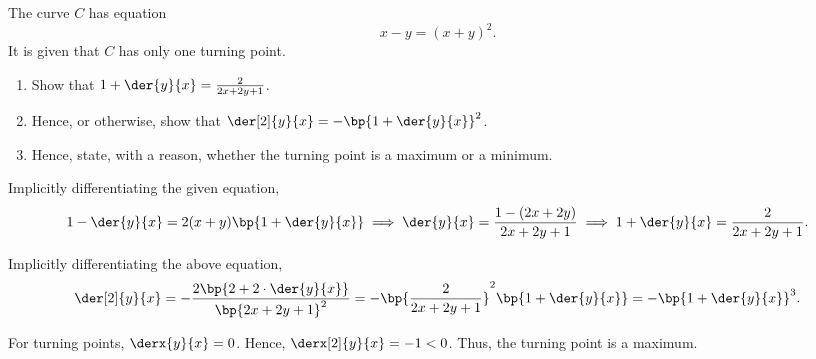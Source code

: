 \begin{solution}
    \begin{center}
    \end{center}
\end{solution}

\clearpage
\begin{problem}
    The curve $C$ has equation \[x - y = (x+y)^2.\] It is given that $C$ has only one turning point.

    \begin{enumerate}
        \item Show that $1 + \der{y}{x} = \frac{2}{2x + 2y + 1}$.
        \item Hence, or otherwise, show that $\der[2]{y}{x} = -\bp{1 + \der{y}{x}}^2$.
        \item Hence, state, with a reason, whether the turning point is a maximum or a minimum.
    \end{enumerate}
\end{problem}
\begin{solution}
    \begin{ppart}
        Implicitly differentiating the given equation, \[1 - \der{y}{x} = 2(x+y)\bp{1 + \der{y}{x}} \implies \der{y}{x} = \frac{1 - (2x + 2y)}{2x + 2y + 1} \implies 1 + \der{y}{x} = \frac{2}{2x+2y+1}.\]
    \end{ppart}
    \begin{ppart}
        Implicitly differentiating the above equation, \[\der[2]{y}{x} = -\frac{2\bp{2 + 2 \cdot \der{y}{x}}}{\bp{2x+2y+1}^2} = -\bp{\frac{2}{2x+2y+1}}^2 \bp{1 + \der{y}{x}} = -\bp{1 + \der{y}{x}}^3.\]
    \end{ppart}
    \begin{ppart}
        For turning points, $\derx{y}{x} = 0$. Hence, $\derx[2]{y}{x} = -1 < 0$. Thus, the turning point is a maximum.
    \end{ppart}
\end{solution}